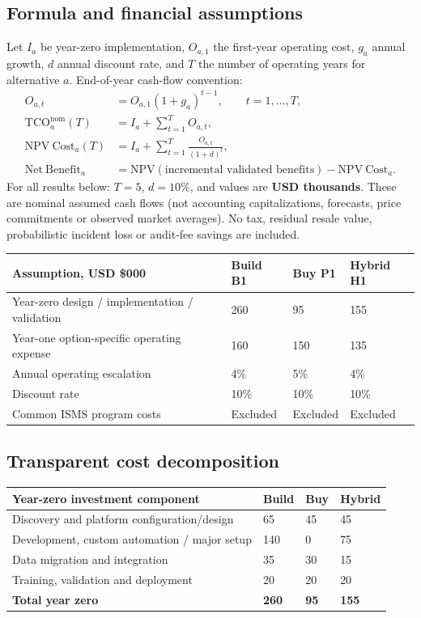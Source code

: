 \documentclass[10pt,letterpaper]{article}
\begin{document}
\subsection{Formula and financial assumptions}
Let $I_a$ be year-zero implementation, $O_{a,1}$ the first-year operating cost, $g_a$ annual growth, $d$ annual discount rate, and $T$ the number of operating years for alternative $a$. End-of-year cash-flow convention:
\begin{align}
O_{a,t}&=O_{a,1}(1+g_a)^{t-1}, \qquad t=1,\ldots,T,\\
\mathrm{TCO}^{\mathrm{nom}}_a(T)&=I_a+\sum_{t=1}^{T}O_{a,t},\\
\mathrm{NPV\ Cost}_a(T)&=I_a+\sum_{t=1}^{T}\frac{O_{a,t}}{(1+d)^t},\\
\mathrm{Net\ Benefit}_a&=\mathrm{NPV}({\text{incremental validated benefits}})-\mathrm{NPV\ Cost}_a.
\end{align}
For all results below: $T=5$, $d=10\%$, and values are \textbf{USD thousands}. These are nominal assumed cash flows (not accounting capitalizations, forecasts, price commitments or observed market averages). No tax, residual resale value, probabilistic incident loss or audit-fee savings are included.


\begin{tabular}{@{}L{2.3in}R{1.15in}R{1.15in}R{1.15in}@{}}
\toprule
\textbf{Assumption, USD \$000} & \textbf{Build B1} & \textbf{Buy P1} & \textbf{Hybrid H1}\\\midrule
Year-zero design / implementation / validation & 260 & 95 & 155\\
Year-one option-specific operating expense & 160 & 150 & 135\\
Annual operating escalation & 4\% & 5\% & 4\%\\
Discount rate & 10\% & 10\% & 10\%\\
Common ISMS program costs & Excluded & Excluded & Excluded\\
\bottomrule
\end{tabular}

\subsection{Transparent cost decomposition}

\begin{tabular}{@{}L{2.15in}R{1.20in}R{1.20in}R{1.20in}@{}}
\toprule
\textbf{Year-zero investment component} & \textbf{Build} & \textbf{Buy} & \textbf{Hybrid}\\\midrule
Discovery and platform configuration/design & 65 & 45 & 45\\
Development, custom automation / major setup & 140 & 0 & 75\\
Data migration and integration & 35 & 30 & 15\\
Training, validation and deployment & 20 & 20 & 20\\\midrule
\textbf{Total year zero} & \textbf{260} & \textbf{95} & \textbf{155}\\
\bottomrule
\end{tabular}
\end{document}
